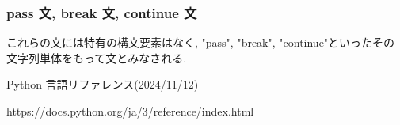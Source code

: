 \documentclass{jlreq}
\begin{document}
            \subsubsection{pass 文, break 文, continue 文}
                これらの文には特有の構文要素はなく, "pass", "break", "continue"といったその文字列単体をもって文とみなされる.
    \begin{thebibliography}{temp}
    Python 言語リファレンス(2024/11/12)
    
    https://docs.python.org/ja/3/reference/index.html
    \end{thebibliography}
\end{document}
